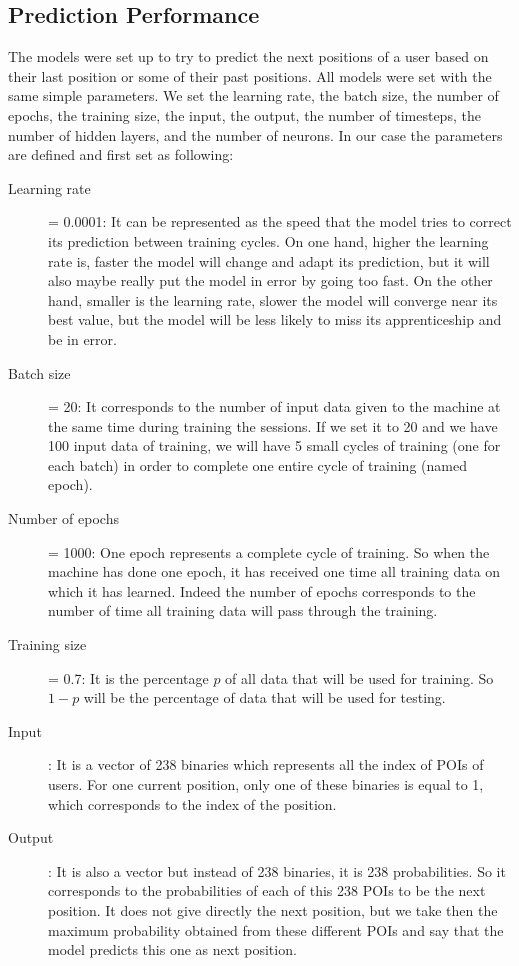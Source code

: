 \documentclass[a4]{article}
\begin{document}
\subsection{Prediction Performance}
The models were set up to try to predict the next positions of a user based on their last position or some of their past positions. All models were set with the same simple parameters. We set the learning rate, the batch size, the number of epochs, the training size, the input, the output, the number of timesteps, the number of hidden layers, and the number of neurons. In our case the parameters are defined and first set as following:
\begin{description}
\item [Learning rate] = 0.0001: It can be represented as the speed that the model tries to correct its prediction between training cycles. On one hand, higher the learning rate is, faster the model will change and adapt its prediction, but it will also maybe really put the model in error by going too fast. On the other hand, smaller is the learning rate, slower the model will converge near its best value, but the model will be less likely to miss its apprenticeship and be in error.
\item [Batch size] = 20: It corresponds to the number of input data given to the machine at the same time during training the sessions. If we set it to 20 and we have 100 input data of training, we will have 5 small cycles of training (one for each batch) in order to complete one entire cycle of training (named epoch).
\item [Number of epochs] = 1000: One epoch represents a complete cycle of training. So when the machine has done one epoch, it has received one time all training data on which it has learned. Indeed the number of epochs corresponds to the number of time all training data will pass through the training.
\item [Training size] = 0.7: It is the percentage $p$ of all data that will be used for training. So $1-p$ will be the percentage of data that will be used for testing.
\item [Input]: It is a vector of 238 binaries which represents all the index of POIs of users. For one current position, only one of these binaries is equal to 1, which corresponds to the index of the position.
\item [Output]: It is also a vector but instead of 238 binaries, it is 238 probabilities. So it corresponds to the probabilities of each of this 238 POIs to be the next position. It does not give directly the next position, but we take then the maximum probability obtained from these different POIs and say that the model predicts this one as next position.

\end{description}
\end{document}
